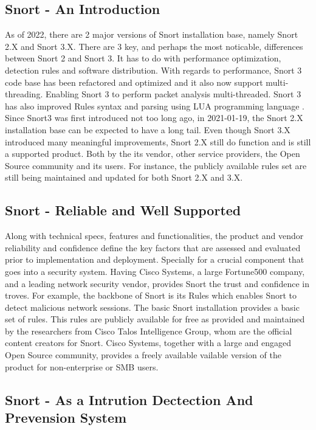 
\subsection{Snort - An Introduction}

As of 2022, there are 2 major versions of Snort installation base, namely Snort 2.X and Snort 3.X. There are 3 key, and perhaps the most noticable, differences between Snort 2 and Snort 3. It has to do with performance optimization, detection rules and software distribution. With regards to performance, Snort 3 code base has been refactored and optimized and it also now support multi-threading. Enabling Snort 3 to perform packet analysis multi-threaded. Snort 3 has also improved Rules syntax and parsing using LUA programming language \cite{Snort2020_MunshawJ}. Since Snort3 was first introduced not too long ago, in 2021-01-19, the Snort 2.X installation base can be expected to have a long tail. Even though Snort 3.X introduced many meaningful improvements, Snort 2.X still do function and is still a supported product. Both by the its vendor, other service providers, the Open Source community and its users. For instance, the publicly available rules set are still being maintained and updated for both Snort 2.X and 3.X. 

\subsection{Snort - Reliable and Well Supported}

Along with technical specs, features and functionalities, the product and vendor reliability and confidence define the key factors that are assessed and evaluated prior to implementation and deployment. Specially for a crucial component that goes into a security system. Having Cisco Systems, a large Fortune500 company, and a leading network security vendor, provides Snort the trust and confidence in troves. For example, the backbone of Snort is its Rules which enables Snort to detect malicious network sessions. The basic Snort installation provides a basic set of rules. This rules are publicly available for free as provided and maintained by the researchers from Cisco Talos Intelligence Group, whom are the official content creators for Snort. Cisco Systems, together with a large and engaged Open Source community, provides a freely available vailable version of the product for non-enterprise or SMB users.

\subsection{Snort - As a Intrution Dectection And Prevension System}

